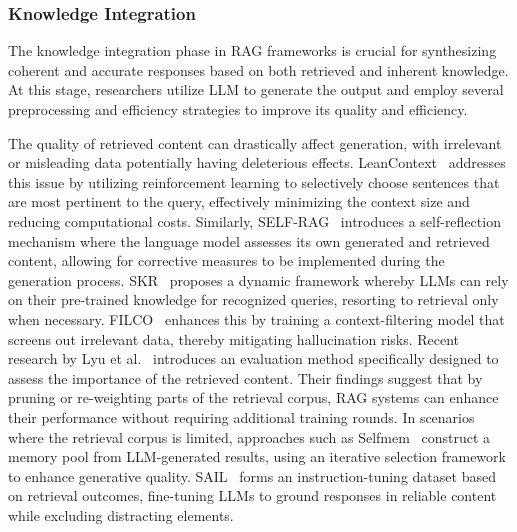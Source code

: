 \documentclass[lettersize,journal]{IEEEtran}
\begin{document}
\subsubsection{Knowledge Integration}
The knowledge integration phase in RAG frameworks is crucial for synthesizing coherent and accurate responses based on both retrieved and inherent knowledge. At this stage, researchers utilize LLM to generate the output and employ several preprocessing and efficiency strategies to improve its quality and efficiency.

The quality of retrieved content can drastically affect generation, with irrelevant or misleading data potentially having deleterious effects. LeanContext~\cite{arefeen2024leancontext} addresses this issue by utilizing reinforcement learning to selectively choose sentences that are most pertinent to the query, effectively minimizing the context size and reducing computational costs. Similarly, SELF-RAG~\cite{asai2023self} introduces a self-reflection mechanism where the language model assesses its own generated and retrieved content, allowing for corrective measures to be implemented during the generation process. SKR~\cite{wang2023self} proposes a dynamic framework whereby LLMs can rely on their pre-trained knowledge for recognized queries, resorting to retrieval only when necessary. FILCO~\cite{wang2023learning} enhances this by training a context-filtering model that screens out irrelevant data, thereby mitigating hallucination risks. Recent research by Lyu et al.~\cite{lyu2023improving} introduces an evaluation method specifically designed to assess the importance of the retrieved content. Their findings suggest that by pruning or re-weighting parts of the retrieval corpus, RAG systems can enhance their performance without requiring additional training rounds. 
In scenarios where the retrieval corpus is limited, approaches such as Selfmem~\cite{cheng2024lift} construct a memory pool from LLM-generated results, using an iterative selection framework to enhance generative quality. SAIL~\cite{luo2023sail} forms an instruction-tuning dataset based on retrieval outcomes, fine-tuning LLMs to ground responses in reliable content while excluding distracting elements.
\end{document}
